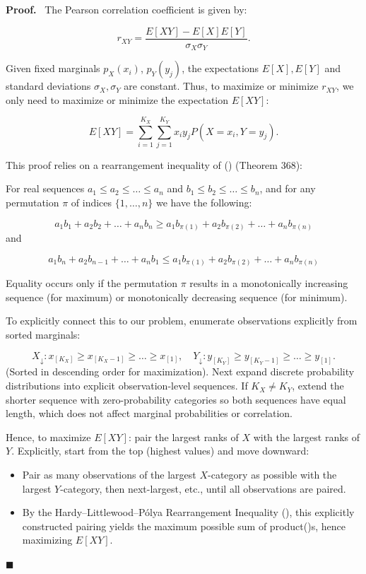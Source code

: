 \documentclass[
  12pt,
]{article}
\theoremstyle{plain}
\theoremstyle{definition}
\renewenvironment{proof}
   {\par\noindent\textbf{Proof.}\ }
   {\hfill$\blacksquare$\par}
\theoremstyle{remark}
\begin{document}
\begin{proof}
The Pearson correlation coefficient is given by:

\[r_{XY} = \frac{E[XY] - E[X]E[Y]}{\sigma_X \sigma_Y}.\]

Given fixed marginals \(p_X(x_i)\), \(p_Y(y_j)\), the expectations
\(E[X], E[Y]\) and standard deviations \(\sigma_X, \sigma_Y\) are
constant. Thus, to maximize or minimize \(r_{XY}\), we only need to
maximize or minimize the expectation \(E[XY]\):

\[E[XY] = \sum_{i=1}^{K_X}\sum_{j=1}^{K_Y} x_i y_j P(X = x_i, Y = y_j).\]

This proof relies on a rearrangement inequality of
() (Theorem 368):

For real sequences \(a_1 \leq a_2 \leq \dots \leq a_n\) and
\(b_1 \leq b_2 \leq \dots \leq b_n\), and for any permutation \(\pi\) of
indices \(\{1,\dots,n\}\) we have the following:

\[a_1 b_1 + a_2 b_2 + \dots + a_n b_n \geq a_1 b_{\pi(1)} + a_2 b_{\pi(2)} + \dots + a_n b_{\pi(n)}\]
and

\[a_1 b_n + a_2 b_{n-1} + \dots + a_n b_1 \leq a_1 b_{\pi(1)} + a_2 b_{\pi(2)} + \dots + a_n b_{\pi(n)}\]

Equality occurs only if the permutation \(\pi\) results in a
monotonically increasing sequence (for maximum) or monotonically
decreasing sequence (for minimum).

To explicitly connect this to our problem, enumerate observations
explicitly from sorted marginals:

\[
X_{\downarrow}: x_{[K_X]} \geq x_{[K_X-1]} \geq \dots \geq x_{[1]}, \quad  
        Y_{\downarrow}: y_{[K_Y]} \geq y_{[K_Y-1]} \geq \dots \geq y_{[1]}.
\] (Sorted in descending order for maximization). Next expand discrete
probability distributions into explicit observation-level sequences. If
\(K_X \neq K_Y\), extend the shorter sequence with zero-probability
categories so both sequences have equal length, which does not affect
marginal probabilities or correlation.

Hence, to maximize \(E[XY]\): pair the largest ranks of \(X\) with the
largest ranks of \(Y\). Explicitly, start from the top (highest values)
and move downward:

\begin{itemize}
\item
  Pair as many observations of the largest \(X\)-category as possible
  with the largest \(Y\)-category, then next-largest, etc., until all
  observations are paired.
\item
  By the Hardy--Littlewood--Pólya Rearrangement Inequality
  (), this explicitly constructed
  pairing yields the maximum possible sum of
  product()s,
  hence maximizing \(E[XY]\).
\end{itemize}


\end{proof}
\end{document}

